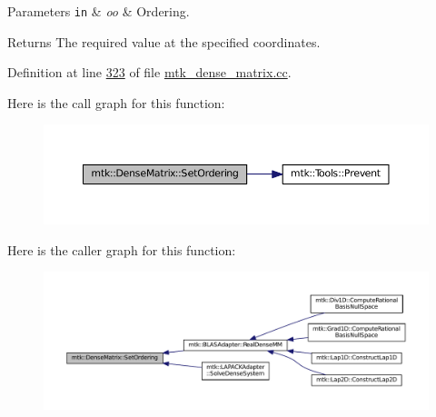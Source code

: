 \begin{DoxyParams}[1]{Parameters}
\mbox{\tt in}  & {\em oo} & Ordering.\\
\hline
\end{DoxyParams}
\begin{DoxyReturn}{Returns}
The required value at the specified coordinates. 
\end{DoxyReturn}


Definition at line \hyperlink{mtk__dense__matrix_8cc_source_l00323}{323} of file \hyperlink{mtk__dense__matrix_8cc_source}{mtk\+\_\+dense\+\_\+matrix.\+cc}.



Here is the call graph for this function\+:\nopagebreak
\begin{figure}[H]
\begin{center}
\leavevmode
\includegraphics[width=350pt]{classmtk_1_1DenseMatrix_a178e63f365cf8c547dc5020c60357f5e_cgraph}
\end{center}
\end{figure}




Here is the caller graph for this function\+:\nopagebreak
\begin{figure}[H]
\begin{center}
\leavevmode
\includegraphics[width=350pt]{classmtk_1_1DenseMatrix_a178e63f365cf8c547dc5020c60357f5e_icgraph}
\end{center}
\end{figure}


